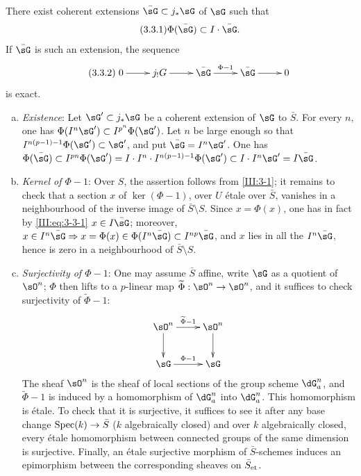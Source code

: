 \begin{lemma_}\label{III:3-3}
There exist coherent extensions $\bar\sG\subset j_*\sG$ of $\sG$ such
that
\begin{equation*}\tag{3.3.1}\label{III:eq:3-3-1}
  \Phi(\bar\sG)\subset I\cdot \bar\sG\text{.}
\end{equation*}
If $\bar\sG$ is such an extension, the sequence
\begin{equation*}\tag{3.3.2}\label{III:eq:3-3-2}
\xymatrix{
  0 \ar[r]
    & j_! G \ar[r]
    & \bar\sG \ar[r]^-{\Phi-1}
    & \bar\sG \ar[r]
    & 0
}
\end{equation*}
is exact.
\end{lemma_}
\begin{enumerate}[a)]
  \item \emph{Existence}: Let $\sG'\subset j_*\sG$ be a coherent extension
    of $\sG$ to $\bar S$. For every $n$, one has
    $\Phi(I^n \sG')\subset I^{p^n}\Phi(\sG')$. Let $n$ be large enough so
    that $I^{n(p-1)-1}\Phi(\sG')\subset \sG'$, and put $\bar\sG=I^n\sG'$.
    One has $\Phi(\bar\sG)\subset I^{p n}\Phi(\sG')
    =I\cdot I^n\cdot I^{n(p-1)-1}\Phi(\sG')\subset I\cdot I^n\sG'
    = I\bar\sG$.
  \item \emph{Kernel of $\Phi-1$}: Over $S$, the assertion follows from
    \ref{III:3-1}; it remains to check that a section $x$ of
    $\ker(\Phi-1)$, over $U$ \'etale over $\bar S$, vanishes in a neighbourhood of
    the inverse image of $\bar S\setminus S$. Since $x=\Phi(x)$, one has in
    fact by \eqref{III:eq:3-3-1} $x\in I\bar\sG$; moreover,
    $x\in I^n\bar\sG\Rightarrow x=\Phi(x)\in\Phi(I^n\bar\sG)\subset I^{n p}\bar\sG$, and $x$ lies in all the $I^n\bar\sG$, hence is zero in a neighbourhood of
    $\bar S\setminus S$.
  \item \emph{Surjectivity of $\Phi-1$}: One may assume $\bar S$ affine,
    write $\sG$ as a quotient of $\sO^n$; $\Phi$ then lifts to a
    $p$-linear map $\widetilde\Phi:\sO^n\to\sO^n$, and it suffices to
    check surjectivity of $\widetilde\Phi-1$:
    \[\xymatrix{
      \sO^n \ar[r]^-{\widetilde \Phi-1} \ar[d]
        & \sO^n \ar[d] \\
      \sG \ar[r]^-{\Phi-1}
        & \sG
    }\]
    The sheaf $\sO^n$ is the sheaf of local sections of the group
    scheme $\dG_a^n$, and $\widetilde\Phi-1$ is induced by a homomorphism
    of $\dG_a^n$ into $\dG_a^n$. This homomorphism is \'etale. To check
    that it is surjective, it suffices to see it after any base change
    $\operatorname{Spec}(k)\to\bar S$ ($k$ algebraically closed) and over $k$ algebraically
    closed, every \'etale homomorphism between connected groups of the same dimension
    is surjective. Finally, an \'etale surjective morphism of
    $\bar S$-schemes induces an epimorphism between the corresponding
    sheaves on ${\bar S}_{\textnormal{et}}$.
\end{enumerate}




